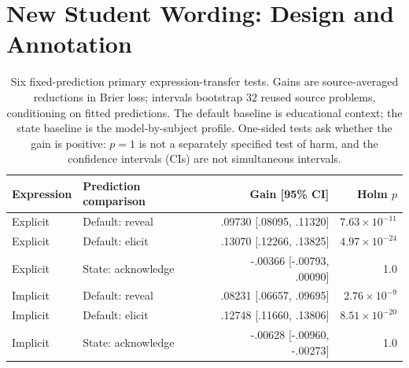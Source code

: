 \section{New Student Wording: Design and Annotation}
\label{app:cue-transfer}

\begin{table}[t]
\centering\small
\begin{tabular}{llrr}
\toprule
Expression & Prediction comparison & Gain [95\% CI] & Holm $p$\\
\midrule
Explicit & Default: reveal & .09730 [.08095, .11320] & $7.63\!\times\!10^{-11}$\\
Explicit & Default: elicit & .13070 [.12266, .13825] & $4.97\!\times\!10^{-24}$\\
Explicit & State: acknowledge & -.00366 [-.00793, .00090] & 1.0\\
Implicit & Default: reveal & .08231 [.06657, .09695] & $2.76\!\times\!10^{-9}$\\
Implicit & Default: elicit & .12748 [.11660, .13806] & $8.51\!\times\!10^{-20}$\\
Implicit & State: acknowledge & -.00628 [-.00960, -.00273] & 1.0\\
\bottomrule
\end{tabular}
\caption{Six fixed-prediction primary expression-transfer tests. Gains are
source-averaged reductions in Brier loss; intervals bootstrap 32 reused source
problems, conditioning on fitted predictions. The default baseline is educational
context; the state baseline is the model-by-subject profile. One-sided tests
ask whether the gain is positive: $p=1$ is not a separately specified test of
harm, and the confidence intervals (CIs) are not simultaneous intervals.}
\label{tab:cue-primary}
\end{table}

